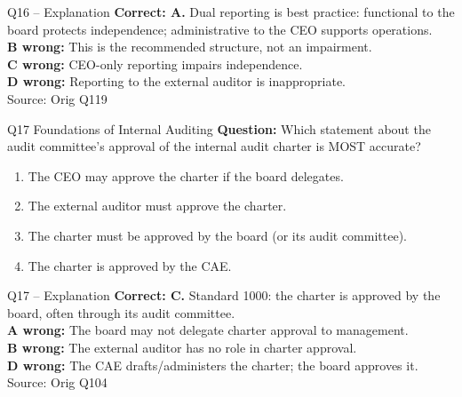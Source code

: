 \documentclass[aspectratio=169,10pt]{beamer}
\begin{document}
\begin{frame}[t]{Q16 -- Explanation}
	\footnotesize
	\textbf{Correct: A.} Dual reporting is best practice: functional to the board protects independence; administrative to the CEO supports operations. \\[5pt]
\textbf{B wrong:} This is the recommended structure, not an impairment. \\[3pt]
\textbf{C wrong:} CEO-only reporting impairs independence. \\[3pt]
\textbf{D wrong:} Reporting to the external auditor is inappropriate. \\[3pt]
	\vfill {\tiny Source: Orig Q119}
\end{frame}

\begin{frame}[t]{Q17 \hfill {\scriptsize Foundations of Internal Auditing}}
	\small
	\textbf{Question:} Which statement about the audit committee's approval of the internal audit charter is MOST accurate?
	\begin{enumerate}[label=\Alph*.,itemsep=1pt,topsep=3pt]
			\item The CEO may approve the charter if the board delegates.
			\item The external auditor must approve the charter.
			\item The charter must be approved by the board (or its audit committee).
			\item The charter is approved by the CAE.
	\end{enumerate}
\end{frame}

\begin{frame}[t]{Q17 -- Explanation}
	\footnotesize
	\textbf{Correct: C.} Standard 1000: the charter is approved by the board, often through its audit committee. \\[5pt]
\textbf{A wrong:} The board may not delegate charter approval to management. \\[3pt]
\textbf{B wrong:} The external auditor has no role in charter approval. \\[3pt]
\textbf{D wrong:} The CAE drafts/administers the charter; the board approves it. \\[3pt]
	\vfill {\tiny Source: Orig Q104}
\end{frame}
\end{document}
